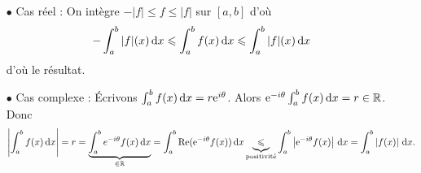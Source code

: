 \documentclass{magnolia}
\begin{document}
\begin{preuve}
\begin{itemize}
\item[$\bullet$] Cas réel : On intègre $-|f|\leq f\leq |f|$ sur $[a,b]$ d'où $$-\int_{a}^{b} |f|(x)\,\text{d}x\leqslant \int_{a}^{b} f(x)\,\text{d}x \leqslant \int_{a}^{b} |f|(x)\,\text{d}x$$ d'où le résultat.
\item[$\bullet$] Cas complexe : \'Ecrivons $\int_{a}^{b} f(x)\,\text{d}x=r{\rm e}^{i\theta}$. Alors ${\rm e}^{-i\theta}\int_{a}^{b} f(x)\,\text{d}x=r\in \mathbb{R}$. Donc $$\left|\int_{a}^{b} f(x)\,\text{d}x\right|=r=\underbrace{\int_{a}^{b} e^{-i\theta}f(x)\,\text{d}x}_{\in \mathbb{R}}=\int_{a}^{b} \mathop{\rm Re}({\rm e}^{-i\theta}f(x))\,\text{d}x\underbrace{\leqslant}_{\text{positivité}} \int_{a}^{b} \left|{\rm e}^{-i\theta}f(x)\right|\,\text{d}x=\int_{a}^{b} \left|f(x)\right|\,\text{d}x.$$
\end{itemize}
\end{preuve}

\end{document}
